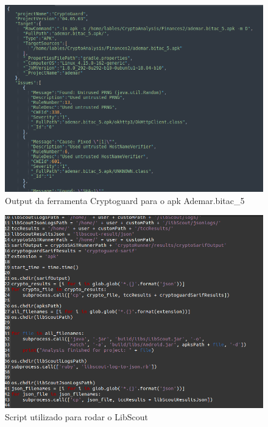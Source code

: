 \begin{figure}[!ht]
  \centering
  \includegraphics[scale=0.5]{img/cryptoguard_output.png}
  \caption{Output da ferramenta Cryptoguard para o apk Ademar.bitac\_5}
  \label{img: cryptoguard_output}
\end{figure}

\FloatBarrier


\begin{figure}[!ht]
  \centering
  \includegraphics[scale=0.5]{img/libscout_script.png}
  \caption{Script utilizado para rodar o LibScout}
  \label{img: libscout_script}
\end{figure}

\FloatBarrier

